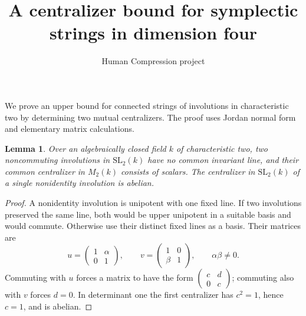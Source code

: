 \documentclass[11pt,a4paper]{article}
\title{A centralizer bound for symplectic strings in dimension four}
\author{Human Compression project}
\date{}
\newtheorem{lemma}{Lemma}
\begin{document}
\maketitle
We prove an upper bound for connected strings of involutions in
characteristic two by determining two mutual centralizers. The proof
uses Jordan normal form and elementary matrix calculations.

\begin{lemma}\label{two}
Over an algebraically closed field $k$ of characteristic two, two
noncommuting involutions in $\mathrm{SL}_2(k)$ have no common invariant
line, and their common centralizer in $M_2(k)$ consists of scalars.
The centralizer in $\mathrm{SL}_2(k)$ of a single nonidentity involution
is abelian.
\end{lemma}
\begin{proof}
A nonidentity involution is unipotent with one fixed line. If two
involutions preserved the same line, both would be upper unipotent
in a suitable basis and would commute. Otherwise use their distinct
fixed lines as a basis. Their matrices are
\[
 u=\begin{pmatrix}1&\alpha\\0&1\end{pmatrix},\qquad
 v=\begin{pmatrix}1&0\\\beta&1\end{pmatrix},\qquad
 \alpha\beta\ne0.
\]
Commuting with $u$ forces a matrix to have the form
$\left(\begin{smallmatrix}c&d\\0&c\end{smallmatrix}\right)$;
commuting also with $v$ forces $d=0$.
In determinant one the first centralizer has $c^2=1$, hence $c=1$,
and is abelian.
\end{proof}
\end{document}
